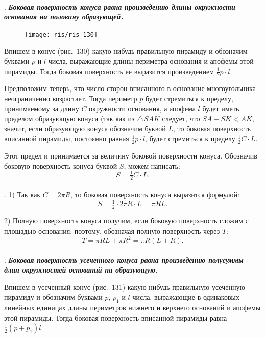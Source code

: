 \documentclass[twoside]{book}
\begin{document}
\paragraph{}\label{1938/s114}
.
\textbf{\emph{Боковая поверхность конуса равна произведению длины окружности основания на половину образующей.}}

\begin{figure}[h!]
\centering
\texttt{[image: ris/ris-130]}
\caption{}
\end{figure}

Впишем в конус (рис.~130) какую-нибудь правильную пирамиду и обозначим буквами $p$ и $l$ числа, выражающие длины периметра основания и апофемы этой пирамиды.
Тогда боковая поверхность ее выразится произведением $\tfrac12 p\cdot l$.

Предположим теперь, что число сторон вписанного в основание многоугольника неограниченно возрастает.
Тогда периметр $p$ будет стремиться к пределу, принимаемому за длину $C$ окружности основания, а апофема $l$ будет иметь пределом образующую конуса (так как из $\triangle SAK$ следует, что $SA -  SK < AK$, значит, если образующую конуса обозначим буквой $L$, то боковая поверхность вписанной пирамиды, постоянно равная $\tfrac12 p\cdot l$, будет стремиться к пределу $\tfrac12 C\cdot L$. %

Этот предел и принимается за величину боковой поверхности конуса.
Обозначив боковую поверхность конуса буквой $S$, можем написать:
\[S = \tfrac12 C\cdot L.\]

\paragraph{}\label{1938/s115}
. 1) Так как $C= 2\pi R$, то боковая поверхность конуса выразится формулой:
\[S
= \tfrac12 \cdot 2\pi R \cdot L
=\pi RL.\]

2) Полную поверхность конуса получим, если боковую поверхность сложим с площадью основания;
поэтому, обозначая полную поверхность через $T$:
\[T= \pi RL + \pi R^2 = \pi R(L + R).\]

\paragraph{}\label{1938/s116}
.
\textbf{\emph{Боковая поверхность усеченного конуса равна произведению полусуммы длин окружностей оснований на образующую.}}

Впишем в усеченный конус (рис.~131) какую-нибудь правильную усеченную пирамиду и обозначим буквами $p$, $p_1$ и $l$ числа, выражающие в одинаковых линейных единицах длины периметров нижнего и верхнего оснований и апофемы этой пирамиды.
Тогда боковая поверхность вписанной пирамиды равна $\tfrac12 (p+p_1)l$.
\end{document}
